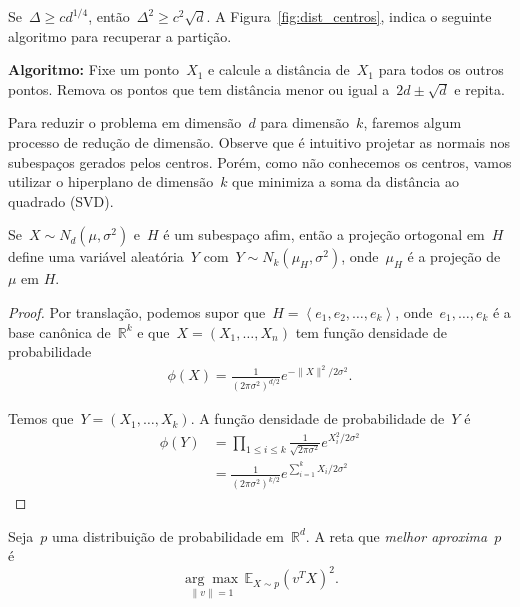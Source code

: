 Se~$\Delta \geq cd^{1/4}$, então~$\Delta^{2} \geq c^{2}\sqrt{d}$. A
Figura~\ref{fig:dist_centros}, indica o seguinte algoritmo para
recuperar a partição.

\textbf{Algoritmo:} Fixe um ponto~$X_{1}$ e calcule a distância
de~$X_{1}$ para todos os outros pontos. Remova os pontos que tem
distância menor ou igual a~$2d \pm \sqrt{d}$ e repita.

Para reduzir o problema em dimensão~$d$ para dimensão~$k$, faremos
algum processo de redução de dimensão. Observe que é intuitivo
projetar as normais nos subespaços gerados pelos centros. Porém, como
não conhecemos os centros, vamos utilizar o hiperplano de dimensão~$k$
que minimiza a soma da distância ao quadrado (SVD).

\begin{fato}
  Se~$X \sim N_{d}(\mu, \sigma^{2})$ e~$H$ é um subespaço afim, então
  a projeção ortogonal em~$H$ define uma variável aleatória~$Y$
  com~$Y \sim N_{k}(\mu_{H}, \sigma^{2})$, onde~$\mu_{H}$ é a projeção
  de~$\mu$ em $H$.
\end{fato}

\begin{proof}
  Por translação, podemos supor
  que~$H=\left<e_{1},e_{2},\dots,e_{k}\right>$,
  onde~$e_{1},\dots,e_{k}$ é a base canônica de~$\mathbb{R}^{k}$ e
  que~$X=(X_{1},\dots,X_{n})$ tem função densidade de probabilidade
  \begin{align*}
    \phi(X)=\frac{1}{\left(2\pi\sigma^{2}\right)^{d/2}}e^{-\lVert X \rVert^{2}/2\sigma^{2}}.
  \end{align*}

  Temos que~$Y=(X_{1},\dots,X_{k})$. A função densidade de
  probabilidade de~$Y$ é
  \begin{align*}
    \phi(Y)&=\prod_{1 \leq i \leq k}\frac{1}{\sqrt{2\pi\sigma^{2}}}e^{X_{i}^{2}/2\sigma^{2}}\\
           &=\frac{1}{\left(2\pi\sigma^{2}\right)^{k/2}}e^{\sum_{i=1}^{k}X_{i}/2\sigma^{2}}
  \end{align*}

\end{proof}

Seja~$p$ uma distribuição de probabilidade em~$\mathbb{R}^{d}$. A reta
que \emph{melhor aproxima~$p$} é
$$\underset{\lVert v \rVert=1}{\arg\max}\,\mathbb{E}_{X \sim p}(v^{T}X)^2.$$
